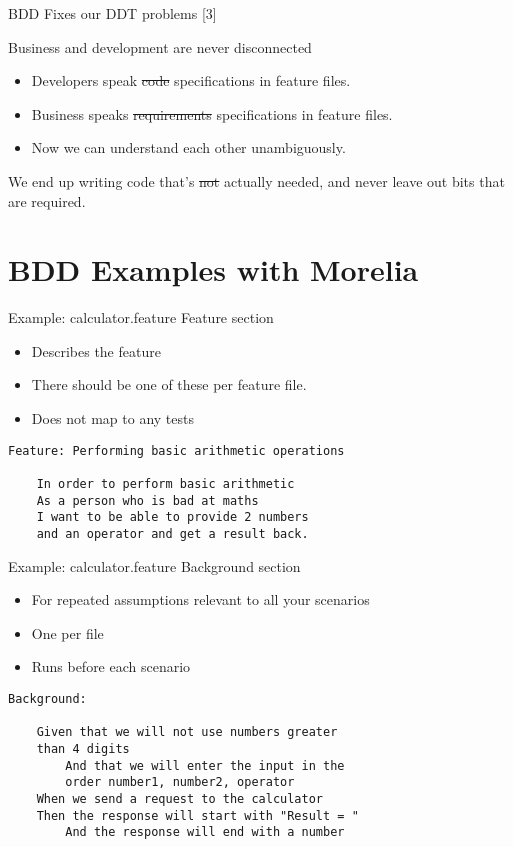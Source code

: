 \documentclass[bigger]{beamer}
\begin{document}
\begin{frame}[label={sec:orgef8df59}]{BDD Fixes our DDT problems [3]}
\begin{block}{Business and development are \alert{never} disconnected}
\begin{itemize}
\item Developers speak \sout{code} specifications in feature files.
\item Business speaks \sout{requirements} specifications in feature files.
\item Now we can understand each other unambiguously.
\end{itemize}
We end up writing code that's \sout{not} actually needed, and \alert{never} leave out bits that are required.
\end{block}
\end{frame}
\section{BDD Examples with Morelia}
\label{sec:org738f921}
\begin{frame}[fragile,label={sec:orgcc16040}]{Example: calculator.feature Feature section}
 \begin{itemize}
\item Describes the feature
\item There should be one of these per feature file.
\item Does not map to any tests
\end{itemize}
\scriptsize
\begin{verbatim}
Feature: Performing basic arithmetic operations

    In order to perform basic arithmetic
    As a person who is bad at maths
    I want to be able to provide 2 numbers
    and an operator and get a result back.
\end{verbatim}
\end{frame}

\begin{frame}[fragile,label={sec:org814e783}]{Example: calculator.feature Background section}
 \begin{itemize}
\item For repeated assumptions relevant to all your scenarios
\item One per file
\item Runs before each scenario
\end{itemize}
\scriptsize
\begin{verbatim}
Background:

    Given that we will not use numbers greater
    than 4 digits
        And that we will enter the input in the
        order number1, number2, operator
    When we send a request to the calculator
    Then the response will start with "Result = "
        And the response will end with a number

\end{verbatim}
\end{frame}
\end{document}
